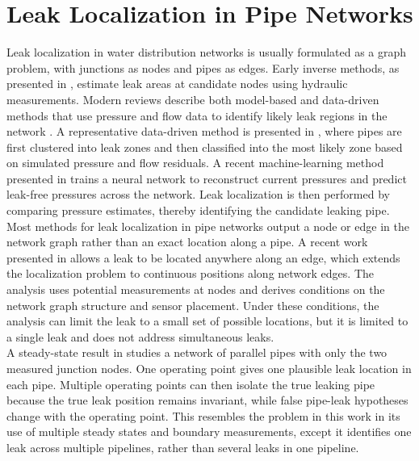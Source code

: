 \section{Leak Localization in Pipe Networks}
\label{sec:lit:pipe_network}

Leak localization in water distribution networks is usually formulated as a graph problem, with junctions as nodes and pipes as edges. Early inverse methods, as presented in \cite{pudar1992}, estimate leak areas at candidate nodes using hydraulic measurements. Modern reviews describe both model-based and data-driven methods that use pressure and flow data to identify likely leak regions in the network \cite{hu2021review}. A representative data-driven method is presented in \cite{hu2021multiscale}, where pipes are first clustered into leak zones and then classified into the most likely zone based on simulated pressure and flow residuals. A recent machine-learning method presented in \cite{zhang2026aignn} trains a neural network to reconstruct current pressures and predict leak-free pressures across the network. Leak localization is then performed by comparing pressure estimates, thereby identifying the candidate leaking pipe.\\

Most methods for leak localization in pipe networks output a node or edge in the network graph rather than an exact location along a pipe. A recent work presented in \cite{molno2024conditions} allows a leak to be located anywhere along an edge, which extends the localization problem to continuous positions along network edges. The analysis uses potential measurements at nodes and derives conditions on the network graph structure and sensor placement. Under these conditions, the analysis can limit the leak to a small set of possible locations, but it is limited to a single leak and does not address simultaneous leaks.\\

A steady-state result in \cite{molno2024parallel} studies a network of parallel pipes with only the two measured junction nodes. One operating point gives one plausible leak location in each pipe. Multiple operating points can then isolate the true leaking pipe because the true leak position remains invariant, while false pipe-leak hypotheses change with the operating point. This resembles the problem in this work in its use of multiple steady states and boundary measurements, except it identifies one leak across multiple pipelines, rather than several leaks in one pipeline.

